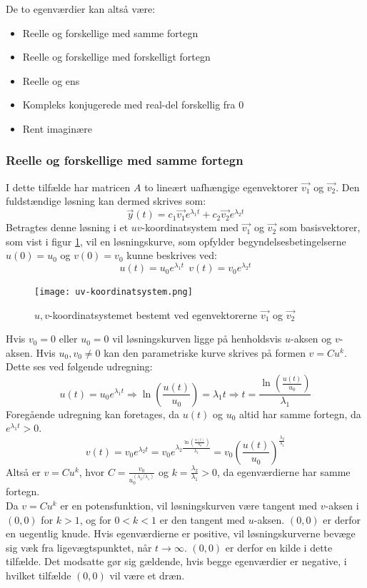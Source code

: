 De to egenværdier kan altså være:
\begin{itemize}
    \item Reelle og forskellige med samme fortegn
    \item Reelle og forskellige med forskelligt fortegn
    \item Reelle og ens
    \item Kompleks konjugerede med real-del forskellig fra 0
    \item  Rent imaginære
\end{itemize}

\subsubsection{Reelle og forskellige med samme fortegn}
I dette tilfælde har matricen $A$ to lineært uafhængige egenvektorer $\vec{v_1}$ og $\vec{v_2}$. Den fuldstændige løsning kan dermed skrives som:
$$\vec{y}(t)=c_1\vec{v_1}e^{\lambda_1 t}+c_2\vec{v_2}e^{\lambda_2 t}$$
Betragtes denne løsning i et $uv$-koordinatsystem med $\vec{v_1}$ og $\vec{v_2}$ som basisvektorer, som vist i figur \ref{uv-koordinatsystem}, vil en løsningskurve, som opfylder begyndelsesbetingelserne $u(0)=u_0$ og $v(0)=v_0$ kunne beskrives ved:
\begin{equation*}
    u(t)=u_0e^{\lambda_1 t} \ \  v(t)=v_0e^{\lambda_2 t}
\end{equation*}
\begin{figure}[H]
    \centering
    \texttt{[image: uv-koordinatsystem.png]}
    \caption{$u,v$-koordinatsystemet bestemt ved egenvektorerne $\vec{v_1}$ og $\vec{v_2}$ \citep[s. 503]{EP}}
    \label{uv-koordinatsystem}
\end{figure}
Hvis $v_0=0$ eller $u_0=0$ vil løsningskurven ligge på henholdsvis $u$-aksen og $v$-aksen. Hvis $u_0,v_0 \neq 0$ kan den parametriske kurve skrives på formen $v=Cu^k$. Dette ses ved følgende udregning:
\begin{equation*}
    u(t)=u_0e^{\lambda_1 t} \Rightarrow \ln \left(\frac{u(t)}{u_0} \right)=\lambda_1 t \Rightarrow t= \frac{\ln \left(\frac{u(t)}{u_0} \right)}{\lambda_1}
\end{equation*}
Foregående udregning kan foretages, da $u(t)$ og $u_0$ altid har samme fortegn, da $e^{\lambda_1 t} > 0$.
\begin{equation*}
v(t)=v_0e^{\lambda_2 t}=v_0e^{\lambda_2 \frac{\ln \left(\frac{u(t)}{u_0} \right)}{\lambda_1}} =  v_0\left(\frac{u(t)}{u_0}\right)^{\frac{\lambda_2}{\lambda_1}}
\end{equation*}
Altså er $v=Cu^k$, hvor $C=\frac{v_0}{u_0^{(\lambda_2 / \lambda_1)}}$ og $k=\frac{\lambda_2}{\lambda_1} > 0$, da egenværdierne har samme fortegn. \\
Da $v=Cu^k$ er en potensfunktion, vil løsningskurven være  tangent med $v$-aksen i $(0,0)$ for $k>1$, og for $0<k<1$ er den tangent med $u$-aksen. $(0,0)$ er derfor en uegentlig knude. Hvis egenværdierne er positive, vil løsningskurverne bevæge sig væk fra ligevægtspunktet, når $t \to \infty$. $(0,0)$ er derfor en kilde i dette tilfælde. Det modsatte gør sig gældende, hvis begge egenværdier er negative, i hvilket tilfælde $(0,0)$ vil være et dræn.
